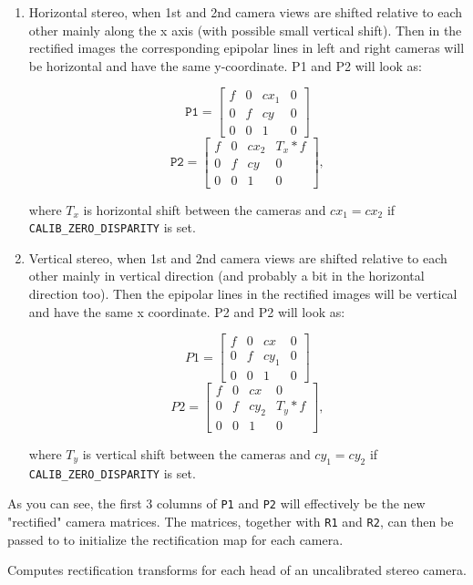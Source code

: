 \begin{enumerate}
\item{Horizontal stereo, when 1st and 2nd camera views are shifted relative to each other mainly along the x axis (with possible small vertical shift). Then in the rectified images the corresponding epipolar lines in left and right cameras will be horizontal and have the same y-coordinate. P1 and P2 will look as: 

\[
\texttt{P1}=
\begin{bmatrix}
f & 0 & cx_1 & 0\\
0 & f & cy & 0\\
0 & 0 & 1 & 0
\end{bmatrix}
\]
\[
\texttt{P2}=
\begin{bmatrix}
f & 0 & cx_2 & T_x*f\\
0 & f & cy & 0\\
0 & 0 & 1 & 0
\end{bmatrix}
,
\]

where $T_x$ is horizontal shift between the cameras and $cx_1=cx_2$ if \texttt{CALIB\_ZERO\_DISPARITY} is set.}
\item{Vertical stereo, when 1st and 2nd camera views are shifted relative to each other mainly in vertical direction (and probably a bit in the horizontal direction too). Then the epipolar lines in the rectified images will be vertical and have the same x coordinate. P2 and P2 will look as:

\[
P1=
\begin{bmatrix}
f & 0 & cx & 0\\
0 & f & cy_1 & 0\\
0 & 0 & 1 & 0
\end{bmatrix}
\]
\[
P2=
\begin{bmatrix}
f & 0 & cx & 0\\
0 & f & cy_2 & T_y*f\\
0 & 0 & 1 & 0
\end{bmatrix}
,
\]

where $T_y$ is vertical shift between the cameras and $cy_1=cy_2$ if \texttt{CALIB\_ZERO\_DISPARITY} is set.}
\end{enumerate} 

As you can see, the first 3 columns of \texttt{P1} and \texttt{P2} will effectively be the new "rectified" camera matrices. 
The matrices, together with \texttt{R1} and \texttt{R2}, can then be passed to  to initialize the rectification map for each camera.  

\label{stereoRectifyUncalibrated}
Computes rectification transforms for each head of an uncalibrated stereo camera.

